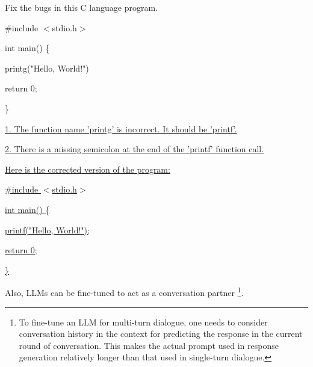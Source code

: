 \vspace{0.5em}
\begin{tcolorbox}
\begin{center}
\parbox{0.9\textwidth}
{

{\color{blue}

Fix the bugs in this C language program.

\vspace{0.3em}

\#include $<$stdio.h$>$

int main() \{

   \hspace{2em} printg("Hello, World!")

   \hspace{2em} return 0;

\}

}

\vspace{0.5em}

\underline{1. The function name 'printg' is incorrect. It should be 'printf'.}

\underline{2. There is a missing semicolon at the end of the 'printf' function call.}

\vspace{0.3em}

\underline{Here is the corrected version of the program: }

\vspace{0.3em}

\underline{\#include $<$stdio.h$>$}

\underline{int main() \{}

\hspace{2em} \underline{printf("Hello, World!");}

\hspace{2em} \underline{return 0;}

\underline{\}}

}
\end{center}
\end{tcolorbox}
\vspace{0.5em}

Also, LLMs can be fine-tuned to act as a conversation partner \footnote{To fine-tune an LLM for multi-turn dialogue, one needs to consider conversation history in the context for predicting the response in the current round of conversation. This makes the actual prompt used in response generation relatively longer than that used in single-turn dialogue.}.

